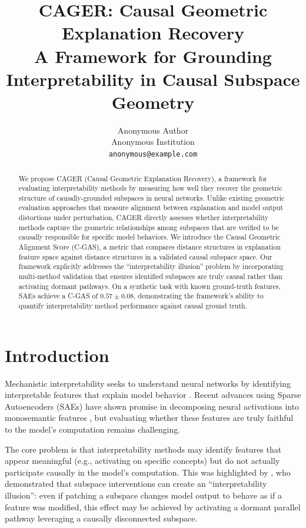 \documentclass{article}
\title{CAGER: Causal Geometric Explanation Recovery\\
A Framework for Grounding Interpretability in Causal Subspace Geometry}
\author{%
  Anonymous Author\\
  Anonymous Institution\\
  \texttt{anonymous@example.com}
}
\begin{document}
\maketitle

\begin{abstract}
We propose CAGER (Causal Geometric Explanation Recovery), a framework for evaluating interpretability methods by measuring how well they recover the geometric structure of causally-grounded subspaces in neural networks. Unlike existing geometric evaluation approaches that measure alignment between explanation and model output distortions under perturbation, CAGER directly assesses whether interpretability methods capture the geometric relationships among subspaces that are verified to be causally responsible for specific model behaviors. We introduce the Causal Geometric Alignment Score (C-GAS), a metric that compares distance structures in explanation feature space against distance structures in a validated causal subspace space. Our framework explicitly addresses the ``interpretability illusion'' problem by incorporating multi-method validation that ensures identified subspaces are truly causal rather than activating dormant pathways. On a synthetic task with known ground-truth features, SAEs achieve a C-GAS of $0.57 \pm 0.08$, demonstrating the framework's ability to quantify interpretability method performance against causal ground truth.
\end{abstract}

\section{Introduction}

Mechanistic interpretability seeks to understand neural networks by identifying interpretable features that explain model behavior \citep{elhage2021mathematical,olah2020zoom}. Recent advances using Sparse Autoencoders (SAEs) have shown promise in decomposing neural activations into monosemantic features \citep{bricken2023monosemanticity,cunningham2023sparse}, but evaluating whether these features are truly faithful to the model's computation remains challenging.

The core problem is that interpretability methods may identify features that appear meaningful (e.g., activating on specific concepts) but do not actually participate causally in the model's computation. This was highlighted by \citet{makelov2024subspace}, who demonstrated that subspace interventions can create an ``interpretability illusion'': even if patching a subspace changes model output to behave as if a feature was modified, this effect may be achieved by activating a dormant parallel pathway leveraging a causally disconnected subspace.
\end{document}
